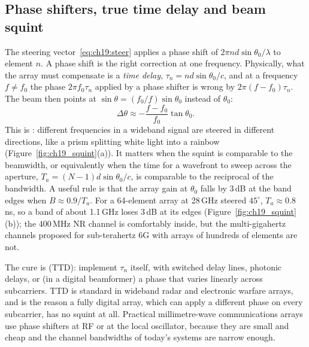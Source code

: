 \subsection{Phase shifters, true time delay and beam squint}

The steering vector~\eqref{eq:ch19:steer} applies a phase shift of $2\pi nd\sin\theta_0/\lambda$ to
element $n$. A phase shift is the right correction at one frequency. Physically, what the array
must compensate is a \emph{time delay}, $\tau_n=nd\sin\theta_0/c$, and at a frequency $f\ne f_0$ the
phase $2\pi f_0\tau_n$ applied by a phase shifter is wrong by $2\pi(f-f_0)\tau_n$. The beam then
points at $\sin\theta=(f_0/f)\sin\theta_0$ instead of $\theta_0$:
\begin{equation}
\Delta\theta\approx-\frac{f-f_0}{f_0}\tan\theta_0 .
\label{eq:ch19:squint}
\end{equation}
This is : different frequencies in a wideband signal are steered in different
directions, like a prism splitting white light into a rainbow (Figure~\ref{fig:ch19_squint}(a)). It
matters when the squint is comparable to the beamwidth, or equivalently when the time for a
wavefront to sweep across the aperture, $T_a=(N-1)d\sin\theta_0/c$, is comparable to the reciprocal
of the bandwidth. A useful rule is that the array gain at $\theta_0$ falls by 3\,dB at the band
edges when $B\approx0.9/T_a$. For a 64-element array at 28\,GHz steered $45^\circ$,
$T_a\approx0.8$\,ns, so a band of about 1.1\,GHz loses 3\,dB at its edges
(Figure~\ref{fig:ch19_squint}(b)); the 400\,MHz NR channel is comfortably inside, but the
multi-gigahertz channels proposed for sub-terahertz 6G with arrays of hundreds of elements are not.

The cure is  (TTD): implement $\tau_n$ itself, with switched delay lines,
photonic delays, or (in a digital beamformer) a phase that varies linearly across subcarriers. TTD is
standard in wideband radar and electronic warfare arrays, and is the reason a fully digital array,
which can apply a different phase on every subcarrier, has no squint at all. Practical
millimetre-wave communications arrays use phase shifters at RF or at the local oscillator, because
they are small and cheap and the channel bandwidths of today's systems are narrow enough.


